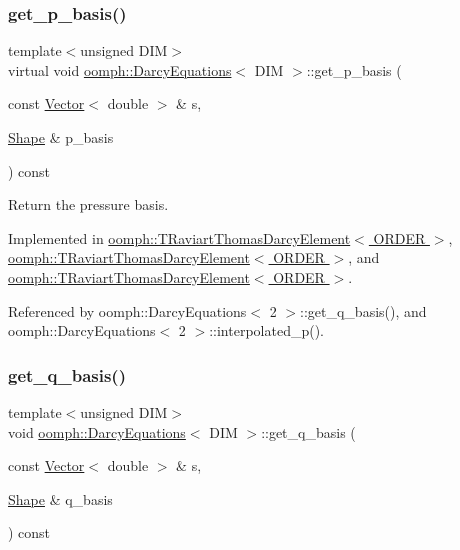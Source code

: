 \subsubsection{\texorpdfstring{get\+\_\+p\+\_\+basis()}{get\_p\_basis()}}
{\footnotesize\ttfamily template$<$unsigned D\+IM$>$ \\
virtual void \hyperlink{classoomph_1_1DarcyEquations}{oomph\+::\+Darcy\+Equations}$<$ D\+IM $>$\+::get\+\_\+p\+\_\+basis (\begin{DoxyParamCaption}\item[{const \hyperlink{classoomph_1_1Vector}{Vector}$<$ double $>$ \&}]{s,  }\item[{\hyperlink{classoomph_1_1Shape}{Shape} \&}]{p\+\_\+basis }\end{DoxyParamCaption}) const\hspace{0.3cm}{\ttfamily [pure virtual]}}



Return the pressure basis. 



Implemented in \hyperlink{classoomph_1_1TRaviartThomasDarcyElement_a745f700fb01e94a3ccfb75faeb2f22c2}{oomph\+::\+T\+Raviart\+Thomas\+Darcy\+Element$<$ O\+R\+D\+E\+R $>$}, \hyperlink{classoomph_1_1TRaviartThomasDarcyElement_ab28d384f8b0f7c8b6f5c9d2a1b7f44bb}{oomph\+::\+T\+Raviart\+Thomas\+Darcy\+Element$<$ O\+R\+D\+E\+R $>$}, and \hyperlink{classoomph_1_1TRaviartThomasDarcyElement_a4781dde90625537d52b7ca2eefaa0b18}{oomph\+::\+T\+Raviart\+Thomas\+Darcy\+Element$<$ O\+R\+D\+E\+R $>$}.



Referenced by oomph\+::\+Darcy\+Equations$<$ 2 $>$\+::get\+\_\+q\+\_\+basis(), and oomph\+::\+Darcy\+Equations$<$ 2 $>$\+::interpolated\+\_\+p().

\mbox{\label{classoomph_1_1DarcyEquations_a4d92638d654ee061508dbd2a6b1c5e95}} 
\subsubsection{\texorpdfstring{get\+\_\+q\+\_\+basis()}{get\_q\_basis()}}
{\footnotesize\ttfamily template$<$unsigned D\+IM$>$ \\
void \hyperlink{classoomph_1_1DarcyEquations}{oomph\+::\+Darcy\+Equations}$<$ D\+IM $>$\+::get\+\_\+q\+\_\+basis (\begin{DoxyParamCaption}\item[{const \hyperlink{classoomph_1_1Vector}{Vector}$<$ double $>$ \&}]{s,  }\item[{\hyperlink{classoomph_1_1Shape}{Shape} \&}]{q\+\_\+basis }\end{DoxyParamCaption}) const\hspace{0.3cm}{\ttfamily [inline]}}



